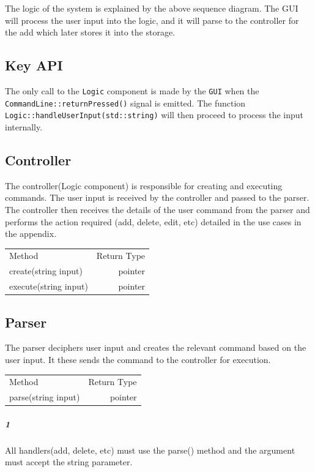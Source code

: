 \documentclass[12pt]{extarticle}
\begin{document}
The logic of the system is explained by the above sequence diagram. The GUI will process the user input into the logic, and it will parse to the controller for the add which later stores it into the storage.

\subsection{Key API}
The only call to the \texttt{Logic} component is made by the \texttt{GUI} when the \texttt{CommandLine::returnPressed()} signal is emitted. The function \texttt{Logic::handleUserInput(std::string)} will then proceed to process the input internally.

\subsection{Controller}

The controller(Logic component) is responsible for creating and executing commands. The user input is received by the controller and passed to the parser. The controller then receives the details of the user command from the parser and performs the action required (add, delete, edit, etc) detailed in the use cases in the appendix.

\begin{center}
\begin{tabular}{|l|r|}
Method                & Return Type \\
create(string input)  & pointer     \\
execute(string input) & pointer    
\end{tabular}
\end{center}

\subsection{Parser}

The parser deciphers user input and creates the relevant command based on the user input. It these sends the command to the controller for execution.

\begin{center}
\begin{tabular}{|l|r|}
Method              & Return Type \\
parse(string input) & pointer    
\end{tabular}
\end{center}

\subparagraph{1} All handlers(add, delete, etc) must use the parse() method and the argument must accept the string parameter.
\end{document}
